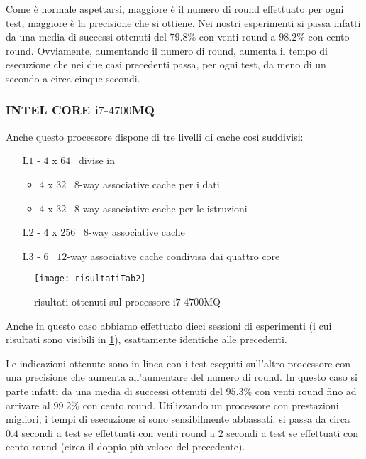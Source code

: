					Come è normale aspettarsi, maggiore è il numero di round effettuato per ogni test, maggiore è la precisione che si ottiene. Nei nostri esperimenti si passa infatti da una media di successi ottenuti del $79.8\%$ con venti round a $98.2\%$ con cento round. Ovviamente, aumentando il numero di round, aumenta il tempo di esecuzione che nei due casi precedenti passa, per ogni test, da meno di un secondo a circa cinque secondi.
					
				\subsubsection*{INTEL CORE i$7$-$4700$MQ} 
				
					Anche questo processore dispone di tre livelli di cache così suddivisi: 
					
					\begin{itemize}
						\item [L$1$ -] $4$ x $64$ \kilobyte \ divise in 
						\begin{itemize}
							\item  $4$ x $32$ \kilobyte \ $8$-way associative cache per i dati
							\item  $4$ x $32$ \kilobyte \ $8$-way associative cache per le istruzioni
						\end{itemize}
						\item[L$2$ -] $4$ x $256$ \kilobyte \ $8$-way associative cache
						\item[L$3$ -] $6$ \megabyte \ $12$-way associative cache condivisa dai quattro core
					\end{itemize}
					
					\begin{figure}
						\begin{center}
							\texttt{[image: risultatiTab2]}
							\caption{risultati ottenuti sul processore i$7$-$4700$MQ}
							\label{fig:risultati2}
						\end{center}
					\end{figure}
					
					Anche in questo caso abbiamo effettuato dieci sessioni di esperimenti (i cui risultati sono visibili in \cref{fig:risultati2}), esattamente identiche alle precedenti.
					
					Le indicazioni ottenute sono in linea con i test eseguiti sull'altro processore con una precisione che aumenta all'aumentare del numero di round. In questo caso si parte infatti da una media di successi ottenuti del $95.3\%$ con venti round fino ad arrivare al $99.2\%$ con cento round. Utilizzando un processore con prestazioni migliori, i tempi di esecuzione si sono sensibilmente abbassati: si passa da circa $0.4$ secondi a test se effettuati con venti round a $2$ secondi a test se effettuati con cento round (circa il doppio più veloce del precedente).
					
